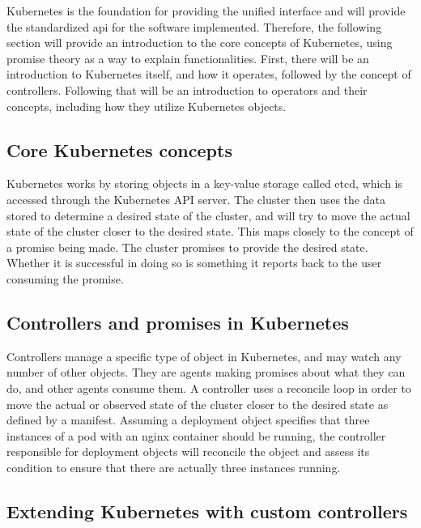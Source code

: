 Kubernetes is the foundation for providing the unified interface and will provide the standardized \gls{api} for the software implemented.
Therefore, the following section will provide an introduction to the core concepts of Kubernetes, using promise theory as a way to explain functionalities.
First, there will be an introduction to Kubernetes itself, and how it operates, followed by the concept of controllers.
Following that will be an introduction to operators and their concepts, including how they utilize Kubernetes objects.

\subsection{Core Kubernetes concepts}
Kubernetes works by storing objects in a key-value storage called etcd, which is accessed through the Kubernetes API server. The cluster then uses the data stored to determine a desired state of the cluster, and will try to move the actual state of the cluster closer to the desired state.
This maps closely to the concept of a promise being made.
The cluster promises to provide the desired state.
Whether it is successful in doing so is something it reports back to the user consuming the promise.
\parencite{poulton2025kubernetes, k8sclustercomponents}

\subsection{Controllers and promises in Kubernetes}
Controllers manage a specific type of object in Kubernetes, and may watch any number of other objects.
They are agents making promises about what they can do, and other agents consume them.
A controller uses a reconcile loop in order to move the actual or observed state of the cluster closer to the desired state as defined by a manifest.
Assuming a \gls{deployment} object specifies that three instances of a \gls{pod} with an \gls{nginx} container should be running, the controller responsible for \gls{deployment} objects will reconcile the object and assess its condition to ensure that there are actually three instances running.
\parencite{poulton2025kubernetes, promise-theory, k8scontrollers, k8sclustercomponents}

\subsection{Extending Kubernetes with custom controllers}

